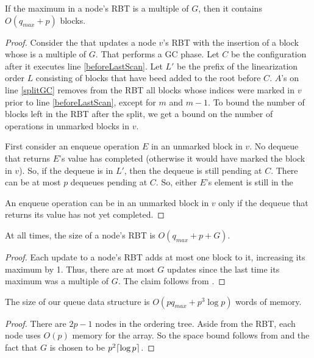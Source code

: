 \begin{lemma}\label{boundAfterGC}
If the maximum  in a node's RBT is a multiple of $G$, then
it contains $O(q_{max}+p)$ blocks.
\end{lemma}
\begin{proof}
Consider the  that updates a node $v$'s RBT with the insertion of a block whose 
 is a multiple of $G$.
That  performs a GC phase.
Let $C$ be the configuration after it executes line \ref{beforeLastScan}.
Let $L'$ be the prefix of the linearization order $L$ consisting of blocks that have beed added to the
root before $C$.
$A$'s  on line \ref{splitGC} removes from the RBT all blocks whose indices
were marked in $v$ prior to line \ref{beforeLastScan}, except for $m$ and $m-1$.
To bound the number of blocks left in the RBT after the split, 
we get a bound on the number of operations in unmarked blocks in $v$.

First consider an enqueue operation $E$ in an unmarked block in $v$.
No dequeue that returns $E$'s value has completed (otherwise it would have marked the block in $v$).
So, if the dequeue is in $L'$, then the dequeue is still pending at $C$.
There can be at most $p$ dequeues pending at $C$.
So, either $E$'s element is still in the 

An enqueue operation can be in an unmarked block in $v$
only if the dequeue that returns its value has not yet completed.


\end{proof}


\begin{corollary}\label{RBTbound}
At all times, the size of a node's RBT is $O(q_{max}+p+G)$. 
\end{corollary}
\begin{proof}
Each update to a node's RBT adds at most one block to it, increasing its maximum  by 1.
Thus, there are at most $G$ updates since the last time its maximum  was a multiple of $G$.
The claim follows from .
\end{proof}

\begin{theorem}\label{spaceBound}
The size of our queue data structure is $O(pq_{max}+p^3\log p)$ words of memory.
\end{theorem}
\begin{proof}
There are $2p-1$ nodes in the ordering tree.  Aside from the RBT, each node uses $O(p)$ memory for the
 array.  So the space bound follows from  and the fact that $G$ is chosen
to be $p^2\lceil \log p \rceil$.
\end{proof}

